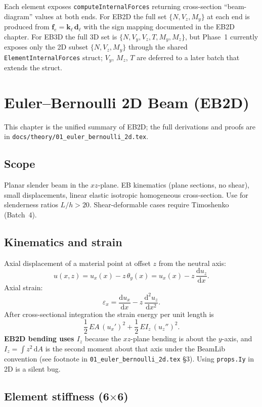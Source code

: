 \documentclass[11pt,a4paper]{book}
\newcommand{\dd}{\mathrm{d}}
\newcommand{\bmath}[1]{\boldsymbol{#1}}
\begin{document}
Each element exposes \texttt{computeInternalForces} returning cross-section ``beam-diagram'' values at both ends. For EB2D the full set $\{N, V_z, M_y\}$ at each end is produced from $\bmath{f}_e = \bmath{k}_\ell\,\bmath{d}_\ell$ with the sign mapping documented in the EB2D chapter. For EB3D the full 3D set is $\{N, V_y, V_z, T, M_y, M_z\}$, but Phase~1 currently exposes only the 2D subset $\{N, V_z, M_y\}$ through the shared \texttt{ElementInternalForces} struct; $V_y$, $M_z$, $T$ are deferred to a later batch that extends the struct.

\chapter{Euler--Bernoulli 2D Beam (EB2D)}\label{ch:eb2d}

This chapter is the unified summary of EB2D; the full derivations and proofs are in \texttt{docs/theory/01\_euler\_bernoulli\_2d.tex}.

\section{Scope}

Planar slender beam in the $xz$-plane. EB kinematics (plane sections, no shear), small displacements, linear elastic isotropic homogeneous cross-section. Use for slenderness ratios $L/h > 20$. Shear-deformable cases require Timoshenko (Batch~4).

\section{Kinematics and strain}

Axial displacement of a material point at offset $z$ from the neutral axis:
\[
u(x, z) = u_x(x) - z\,\theta_y(x) = u_x(x) - z\,\frac{\dd u_z}{\dd x}.
\]
Axial strain:
\[
\varepsilon_x = \frac{\dd u_x}{\dd x} - z\,\frac{\dd^2 u_z}{\dd x^2}.
\]
After cross-sectional integration the strain energy per unit length is
\[
\frac{1}{2}\,EA\,(u_x')^2 + \frac{1}{2}\,EI_z\,(u_z'')^2.
\]
\textbf{EB2D bending uses $I_z$} because the $xz$-plane bending is about the $y$-axis, and $I_z = \int z^2\,\dd A$ is the second moment about that axis under the BeamLib convention (see footnote in \texttt{01\_euler\_bernoulli\_2d.tex} \S3). Using \texttt{props.Iy} in 2D is a silent bug.

\section{Element stiffness (6\texorpdfstring{$\times$}{x}6)}
\end{document}
